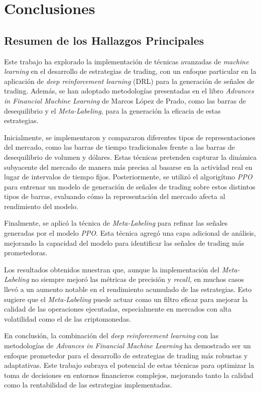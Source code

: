 \documentclass[a4paper,12pt, twoside]{report}
\begin{document}
\chapter{Conclusiones}

\section{Resumen de los Hallazgos Principales}


Este trabajo ha explorado la implementación de técnicas avanzadas de \textit{machine learning} 
en el desarrollo de estrategias de trading, con un enfoque particular en la aplicación de 
\textit{deep reinforcement learning} (DRL) para la generación de señales de trading. Además, 
se han adoptado metodologías presentadas en el libro \textit{Advances in Financial Machine Learning} 
de Marcos López de Prado, como las barras de desequilibrio y el \textit{Meta-Labeling}, para 
la generación la eficacia de estas estrategias.

Inicialmente, se implementaron y compararon diferentes tipos de representaciones del mercado, 
como las barras de tiempo tradicionales frente a las barras de desequilibrio de volumen y dólares. 
Estas técnicas pretenden capturar la dinámica subyacente del mercado de manera más precisa al 
basarse en la actividad real en lugar de intervalos de tiempo fijos. Posteriormente, se 
utilizó el algorigítmo \textit{PPO} para entrenar un modelo de generación de señales de trading sobre estos distintos 
tipos de barras, evaluando cómo la representación del mercado afecta al rendimiento del modelo.

Finalmente, se aplicó la técnica de \textit{Meta-Labeling} para refinar las señales generadas por el 
modelo \textit{PPO}. Esta técnica agregó una capa adicional de análisis, mejorando la 
capacidad del modelo para identificar las señales de trading más prometedoras. 

Los resultados obtenidos muestran que, aunque la implementación del \textit{Meta-Labeling} 
no siempre mejoró las métricas de precisión y \textit{recall}, en muchos casos llevó a un 
aumento notable en el rendimiento acumulado de las estrategias. Esto sugiere que el 
\textit{Meta-Labeling} puede actuar como un filtro eficaz para mejorar la calidad de las 
operaciones ejecutadas, especialmente en mercados con alta volatilidad como el de las 
criptomonedas.

En conclusión, la combinación del \textit{deep reinforcement learning} con las metodologías 
de \textit{Advances in Financial Machine Learning} ha demostrado ser un enfoque prometedor 
para el desarrollo de estrategias de trading más robustas y adaptativas. Este trabajo 
subraya el potencial de estas técnicas para optimizar la toma de decisiones en entornos 
financieros complejos, mejorando tanto la calidad como la rentabilidad de las estrategias 
implementadas.
\end{document}
